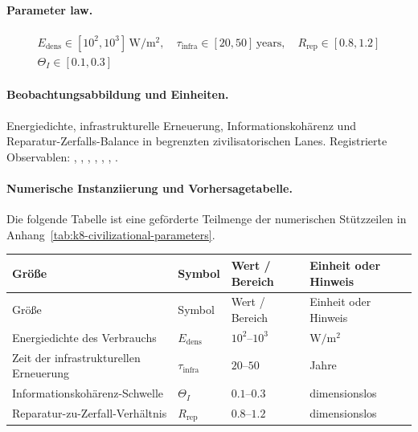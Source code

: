 \paragraph{Parameter law.}
\[
\begin{gathered} E_{\mathrm{dens}} \in [10^2,10^3]\,\mathrm{W/m^2},\quad \tau_{\mathrm{infra}} \in [20,50]\,\mathrm{years},\quad R_{\mathrm{rep}} \in [0.8,1.2] \\ \Theta_I \in [0.1,0.3] \end{gathered}
\]

\paragraph{Beobachtungsabbildung und Einheiten.}
Energiedichte, infrastrukturelle Erneuerung, Informationskohärenz und Reparatur-Zerfalls-Balance in begrenzten zivilisatorischen Lanes.
Registrierte Observablen: , \allowbreak {}, \allowbreak {}, \allowbreak {}, \allowbreak {}, \allowbreak {}, \allowbreak {}.

\paragraph{Numerische Instanziierung und Vorhersagetabelle.}
Die folgende Tabelle ist eine geförderte Teilmenge der numerischen Stützzeilen in Anhang~\ref{tab:k8-civilizational-parameters}.
\begin{longtable}{@{}L{0.27\textwidth}L{0.15\textwidth}L{0.24\textwidth}L{0.16\textwidth}@{}}
\toprule
Größe & Symbol & Wert / Bereich & Einheit oder Hinweis \\
\midrule
\endfirsthead
\toprule
Größe & Symbol & Wert / Bereich & Einheit oder Hinweis \\
\midrule
\endhead
Energiedichte des Verbrauchs & $\scriptstyle E_{\mathrm{dens}}$ & $10^2\text{--}10^3$ & $\mathrm{W/m^2}$ \\
Zeit der infrastrukturellen Erneuerung & $\scriptstyle \tau_{\mathrm{infra}}$ & $20\text{--}50$ & Jahre \\
Informationskohärenz-Schwelle & $\scriptstyle \Theta_I$ & $0.1\text{--}0.3$ & dimensionslos \\
Reparatur-zu-Zerfall-Verhältnis & $\scriptstyle R_{\mathrm{rep}}$ & $0.8\text{--}1.2$ & dimensionslos \\
\bottomrule
\end{longtable}

